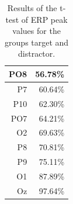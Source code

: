 \documentclass[a4paper]{article}
\begin{document}
\begin{table}[]
\begin{tabular}{|r|r|}
\rowcolor[HTML]{FFFFFF} 
{\color[HTML]{000000} PO8}                                                            & {\color[HTML]{000000} 56.78\%}                                                 \\ \hline
\rowcolor[HTML]{FFFFFF} 
{\color[HTML]{000000} P7}                                                             & {\color[HTML]{000000} 60.64\%}                                                 \\ \hline
\rowcolor[HTML]{FFFFFF} 
{\color[HTML]{000000} P10}                                                            & {\color[HTML]{000000} 62.30\%}                                                 \\ \hline
\rowcolor[HTML]{FFFFFF} 
{\color[HTML]{000000} PO7}                                                            & {\color[HTML]{000000} 64.21\%}                                                 \\ \hline
\rowcolor[HTML]{FFFFFF} 
{\color[HTML]{000000} O2}                                                             & {\color[HTML]{000000} 69.63\%}                                                 \\ \hline
\rowcolor[HTML]{FFFFFF} 
{\color[HTML]{000000} P8}                                                             & {\color[HTML]{000000} 70.81\%}                                                 \\ \hline
\rowcolor[HTML]{FFFFFF} 
{\color[HTML]{000000} P9}                                                             & {\color[HTML]{000000} 75.11\%}                                                 \\ \hline
\rowcolor[HTML]{FFFFFF} 
{\color[HTML]{000000} O1}                                                             & {\color[HTML]{000000} 87.89\%}                                                 \\ \hline
\rowcolor[HTML]{FFFFFF} 
{\color[HTML]{000000} Oz}                                                             & {\color[HTML]{000000} 97.64\%}                                                 \\ \hline
\end{tabular}
\label{tab:ttest}
\caption{Results of the t-test of ERP peak values for the groups target and distractor.}
\end{table}
\end{document}
